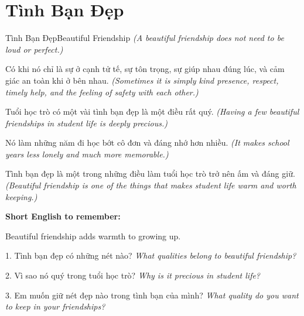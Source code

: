 \section{Tình Bạn Đẹp}
\begin{truyen}{Tình Bạn Đẹp}{Beautiful Friendship}
\textit{(A beautiful friendship does not need to be loud or perfect.)}

Có khi nó chỉ là sự ở cạnh tử tế, sự tôn trọng, sự giúp nhau đúng lúc, và cảm giác an toàn khi ở bên nhau.
\textit{(Sometimes it is simply kind presence, respect, timely help, and the feeling of safety with each other.)}

Tuổi học trò có một vài tình bạn đẹp là một điều rất quý.
\textit{(Having a few beautiful friendships in student life is deeply precious.)}

Nó làm những năm đi học bớt cô đơn và đáng nhớ hơn nhiều.
\textit{(It makes school years less lonely and much more memorable.)}
\end{truyen}

\begin{baihoc}
Tình bạn đẹp là một trong những điều làm tuổi học trò trở nên ấm và đáng giữ.
\textit{(Beautiful friendship is one of the things that makes student life warm and worth keeping.)}
\end{baihoc}

\begin{ghinhoanh}
\textbf{Short English to remember:}

Beautiful friendship adds warmth to growing up.

\end{ghinhoanh}

\begin{tuhocnhanh}
1. Tình bạn đẹp có những nét nào? \textit{What qualities belong to beautiful friendship?}

2. Vì sao nó quý trong tuổi học trò? \textit{Why is it precious in student life?}

3. Em muốn giữ nét đẹp nào trong tình bạn của mình? \textit{What quality do you want to keep in your friendships?}
\end{tuhocnhanh}
\ngancach